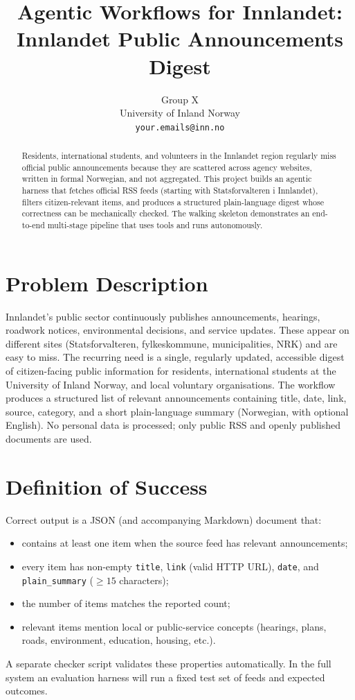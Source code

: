 \documentclass{article}
\title{Agentic Workflows for Innlandet:\\
Innlandet Public Announcements Digest}
\author{
  Group X \\
  University of Inland Norway \\
  \texttt{your.emails@inn.no}
}
\begin{document}
\maketitle

\begin{abstract}
Residents, international students, and volunteers in the Innlandet region regularly miss official public announcements because they are scattered across agency websites, written in formal Norwegian, and not aggregated. This project builds an agentic harness that fetches official RSS feeds (starting with Statsforvalteren i Innlandet), filters citizen-relevant items, and produces a structured plain-language digest whose correctness can be mechanically checked. The walking skeleton demonstrates an end-to-end multi-stage pipeline that uses tools and runs autonomously.
\end{abstract}

\section{Problem Description}
Innlandet’s public sector continuously publishes announcements, hearings, roadwork notices, environmental decisions, and service updates. These appear on different sites (Statsforvalteren, fylkeskommune, municipalities, NRK) and are easy to miss. The recurring need is a single, regularly updated, accessible digest of citizen-facing public information for residents, international students at the University of Inland Norway, and local voluntary organisations. The workflow produces a structured list of relevant announcements containing title, date, link, source, category, and a short plain-language summary (Norwegian, with optional English). No personal data is processed; only public RSS and openly published documents are used.

\section{Definition of Success}
Correct output is a JSON (and accompanying Markdown) document that:
\begin{itemize}
  \item contains at least one item when the source feed has relevant announcements;
  \item every item has non-empty \texttt{title}, \texttt{link} (valid HTTP URL), \texttt{date}, and \texttt{plain\_summary} ($\geq 15$ characters);
  \item the number of items matches the reported count;
  \item relevant items mention local or public-service concepts (hearings, plans, roads, environment, education, housing, etc.).
\end{itemize}
A separate checker script validates these properties automatically. In the full system an evaluation harness will run a fixed test set of feeds and expected outcomes.
\end{document}
